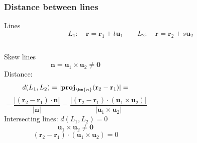 \begin{frame}
  \frametitle{Distance between lines}
     Lines
    $$L_1: \quad \textbf{r}= \textbf{r}_1+t\textbf{u}_1 \qquad L_2: \quad \textbf{r}= \textbf{r}_2+s\textbf{u}_2$$

   \begin{columns}[t]
    \column[T]{6cm}
    \textcolor[rgb]{0.98,0.00,0.00}{Skew lines}
    $$\textbf{n} = \textbf{u}_1 \times \textbf{u}_2 \neq \textbf{0}$$
    \textcolor[rgb]{0.98,0.00,0.00}{Distance}:
    $$
      d(L_1,L_2)  = |\textbf{\text{proj}}_{\bm{n}} (\textbf{r}_2-\textbf{r}_1)| =$$
      $$= \boxed{\frac{|(\textbf{r}_2-\textbf{r}_1)\cdot \textbf{n}|}{|\textbf{n}|}}=
      \frac{|(\textbf{r}_2-\textbf{r}_1)\cdot (\textbf{u}_1\times \textbf{u}_2)|}{|\textbf{u}_1\times \textbf{u}_2|}$$
    \textcolor[rgb]{0.98,0.00,0.00}{Intersecting} lines: $d(L_1,L_2)=0$
    $$\textbf{u}_1\times \textbf{u}_2 \neq \textbf{0}$$
    $$(\textbf{r}_2-\textbf{r}_1) \cdot (\textbf{u}_1\times \textbf{u}_2) = 0$$

    \column{6.5cm}
  \end{columns}
\end{frame}
